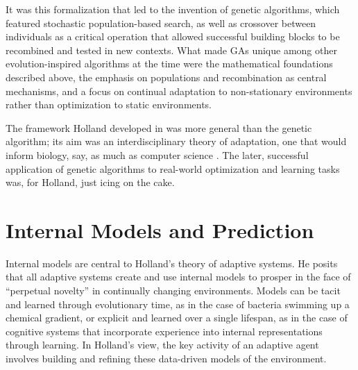 \documentclass{sig-alternate}
\begin{document}
It was this formalization
that led to the invention of genetic algorithms, which featured stochastic
population-based search, as well as
crossover between individuals as a critical
operation that allowed successful building blocks to be recombined and
tested in new contexts.  What made GAs unique
among other evolution-inspired algorithms at the time were the
mathematical foundations described above, the emphasis on populations
and recombination as central mechanisms,
and a focus 
on continual adaptation to
non-stationary environments rather than optimization to static
environments.

The framework Holland developed in \cite{Holland1975} was more general
than the genetic algorithm; its aim was an interdisciplinary theory of
adaptation, one that would inform biology, say, as much as computer
science \cite{Christiansen1998}.  The later, successful application of
genetic algorithms to real-world optimization and learning tasks was,
for Holland, just icing on the cake.

\section{Internal Models and Prediction}


Internal models are central to Holland's theory of adaptive
systems.  He posits that all adaptive systems create and use internal
models to prosper in the face of ``perpetual novelty'' in continually changing environments.   Models can be tacit and learned
  through evolutionary time, as in the case of bacteria swimming up a
  chemical gradient, or explicit and learned over a single lifespan,
  as in the case of cognitive systems that incorporate experience into
  internal representations through learning.  In
  Holland's view, the key activity of an adaptive agent involves
  building and refining these data-driven models
  of the environment.
\end{document}
